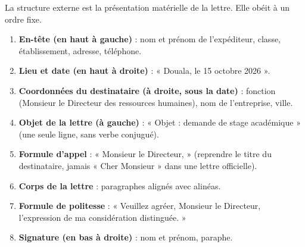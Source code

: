 \documentclass[11pt]{article}
\newcommand{\cle}[1]{{\popxbold\color{popdark}#1}}
\begin{document}
\begin{methode}
La \cle{structure externe} est la présentation matérielle de la lettre. Elle obéit à un ordre fixe.
\begin{enumerate}
\item \textbf{En-tête (en haut à gauche)} : nom et prénom de l'expéditeur, classe, établissement, adresse, téléphone.
\item \textbf{Lieu et date (en haut à droite)} : « Douala, le 15 octobre 2026 ».
\item \textbf{Coordonnées du destinataire (à droite, sous la date)} : fonction (Monsieur le Directeur des ressources humaines), nom de l'entreprise, ville.
\item \textbf{Objet de la lettre (à gauche)} : « Objet : demande de stage académique » (une seule ligne, sans verbe conjugué).
\item \textbf{Formule d'appel} : « Monsieur le Directeur, » (reprendre le titre du destinataire, jamais « Cher Monsieur » dans une lettre officielle).
\item \textbf{Corps de la lettre} : paragraphes alignés avec alinéas.
\item \textbf{Formule de politesse} : « Veuillez agréer, Monsieur le Directeur, l'expression de ma considération distinguée. »
\item \textbf{Signature (en bas à droite)} : nom et prénom, paraphe.
\end{enumerate}
\end{methode}
\end{document}
